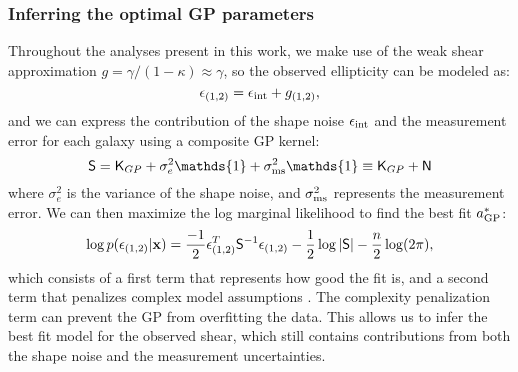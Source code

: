 \subsubsection{Inferring the optimal GP parameters}
Throughout the analyses present in this work, 
we make use of the weak shear approximation 
$g = \gamma / (1 - \kappa)  \approx \gamma$, so the observed ellipticity can be
modeled as: 
\begin{equation}
	\epsilon_{(1, 2)} = \epsilon_{\rm int} + g_{(1, 2)}, 
	\label{eq:weak_shear_approx}
\end{equation}
and we can express the contribution of the shape noise $\epsilon_{\rm int}$
and the measurement error
for each galaxy using a composite GP kernel:
\begin{equation}
	\mathsf{S} = \kerngp_{GP} + \sigma_e^2 \mathds{1}  + \sigma_{\rm ms}^2
	\mathds{1}
	\equiv \kerngp_{GP} + \mathsf{N}
\end{equation}
where $\sigma_e^2$ is the variance of the shape noise, and $\sigma_{\rm ms}^2$
represents the measurement error.
We can then maximize the log marginal likelihood to find the best fit
$a_{\rm GP}^*$: 
\begin{equation}
	\log p(\epsilon_{(1,2)} | \mathbf{x}) = \frac{-1}{2}\epsilon_{(1,2)}^T \mathsf{S}^{-1}
\epsilon_{(1, 2)}
- \frac{1}{2}\log|\mathsf{S}| - \frac{n}{2}\log(2\pi),
\label{eq:log_marginal_likelihood}
\end{equation}
which consists of a first term that represents how good the fit is,
and a second term that penalizes complex model assumptions \citep{Rasmussen2006}. 
The complexity penalization term can prevent the GP from overfitting the data.
This allows us to infer the best fit model for the observed shear, which still
contains contributions from both the shape noise and the measurement
uncertainties. 

